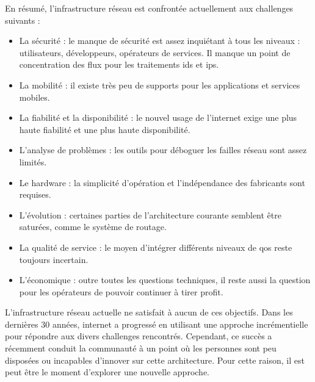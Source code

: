 En résumé, l'infrastructure réseau est confrontée actuellement aux challenges suivants :
\begin{itemize}
\item La sécurité : le manque de sécurité est assez inquiétant à tous les niveaux : utilisateurs, développeurs, opérateurs de services. Il manque un point de concentration des flux pour les traitements \gls{ids} et \gls{ips}.
\item La mobilité : il existe très peu de supports pour les applications et services mobiles.
\item La fiabilité et la disponibilité : le nouvel usage de l'internet exige une plus haute fiabilité et une plus haute disponibilité.
\item L'analyse de problèmes : les outils pour déboguer les failles réseau sont assez limités.


\item Le hardware : la simplicité d'opération et l'indépendance des fabricants sont requises.

\item L'évolution : certaines parties de l'architecture courante semblent être saturées, comme le système de routage.
\item La qualité de service : le moyen d'intégrer différents niveaux de \gls{qos} reste toujours incertain.
\item L'économique : outre toutes les questions techniques, il reste aussi la question pour les opérateurs de pouvoir continuer à tirer profit.
\end{itemize}
\cite{InernetCleanSlateDesignIntro}

L'infrastructure réseau actuelle ne satisfait à aucun de ces objectifs. \cite{fabricIntro}  Dans les dernières 30 années, internet a progressé en utilisant une approche incrémentielle pour répondre aux divers challenges rencontrés. Cependant, ce succès a récemment conduit la communauté à un point où les personnes sont peu disposées ou incapables d'innover sur cette architecture. Pour cette raison, il est peut être le moment d'explorer une nouvelle approche. \cite{InernetCleanSlateDesignApproach}

